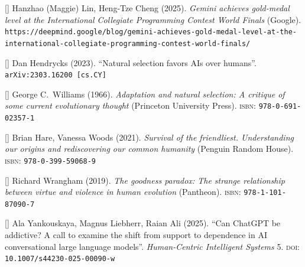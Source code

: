 \documentclass[12pt]{article}
\newcommand{\citestrut}[1]{\vphantom{[}{#1}\vphantom{]}}
\newcommand{\custombibitem}[3]{\hypertarget{#1}{[\href{#2}{\citestrut{#1}}] {#3}}}
\begin{document}
\custombibitem{ICPC}
{https://deepmind.google/blog/gemini-achieves-gold-medal-level-at-the-international-collegiate-programming-contest-world-finals/}
{Hanzhao (Maggie) Lin, Heng-Tze Cheng (2025).
\textit{Gemini achieves gold-medal level at the International Collegiate Programming
Contest World Finals} (Google).
{\tt https://deepmind.google/blog/gemini-achieves-gold-medal-level-at-the-\\
international-collegiate-programming-contest-world-finals/}}

\custombibitem{NaturalSelection}{https://arxiv.org/abs/2303.16200}
{Dan Hendrycks (2023).
``Natural selection favors AIs over humans''.
{\tt arXiv:2303.16200 [cs.CY]}}

\custombibitem{GenesFirst}
{https://en.wikipedia.org/wiki/Adaptation_and_Natural_Selection}
{George C.\ Williams (1966).
\textit{Adaptation and natural selection: A critique of some current evolutionary
thought} (Princeton University Press).
\textsc{isbn}: {\tt 978-0-691-02357-1}}

\custombibitem{SelfDomestication}
{https://www.penguinrandomhouse.com/books/550437/survival-of-the-friendliest-by-brian-hare-and-vanessa-woods/}
{Brian Hare, Vanessa Woods (2021).
\textit{Survival of the friendliest. Understanding our origins and rediscovering our
common humanity} (Penguin Random House).
\textsc{isbn}: {\tt 978-0-399-59068-9}}

\custombibitem{GoodnessParadox}{https://en.wikipedia.org/wiki/The_Goodness_Paradox}
{Richard Wrangham (2019).
\textit{The goodness paradox: The strange relationship between virtue and violence in
human evolution} (Pantheon).
\textsc{isbn}: {\tt 978-1-101-87090-7}}

\custombibitem{Addiction}{https://link.springer.com/article/10.1007/s44230-025-00090-w}
{Ala Yankouskaya, Magnus Liebherr, Raian Ali (2025).
``Can ChatGPT be addictive? A call to examine the shift from support to dependence in
AI conversational large language models''.
\textit{Human-Centric Intelligent Systems} 5.
\textsc{doi}: {\tt 10.1007/s44230-025-00090-w}}
\end{document}
